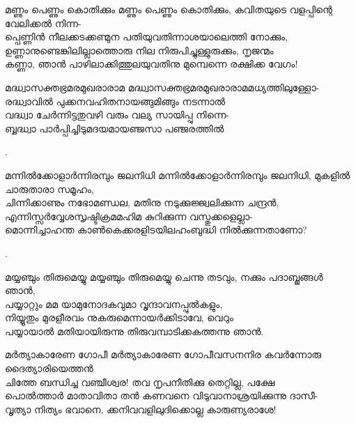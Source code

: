 \begin{enumerate}

\begin{slokam}{\VSr}{\VKG}{മണ്ണും പെണ്ണും കൊതിക്കും}
 മണ്ണും പെണ്ണും കൊതിക്കും, കവിതയുടെ വളപ്പിന്റെ വേലിക്കൽ നിന്ന-\\
പ്പെണ്ണിൻ നീലക്കടക്കണ്മുന പതിയുവതിന്നാശയാലെത്തി നോക്കും,\\
ഉണ്ണാനുണ്ടെങ്കിലില്ലാത്തൊരു നില നിരുപിച്ചുള്ളുരുക്കും, നൃജന്മം\\
കണ്ണാ, ഞാൻ പാഴിലാക്കിത്തുലയുവതിനു മുമ്പെന്നെ രക്ഷിക്ക വേഗം!
\end{slokam}




\begin{slokam}{\VMk}{\KV}{മദ്ധ്വാസക്തഭ്രമരമുഖരാരാമ}
മദ്ധ്വാസക്തഭ്രമരമുഖരാരാമമധ്യത്തിലുള്ളോ-\\
രദ്ധ്വാവിൽ പുക്കനവഹിതനായങ്ങുമിങ്ങും നടന്നാൽ\\
വദ്ധ്വാ ചേർന്നിട്ടതുവഴി വരും വല്യ സായിപ്പു നിന്നെ-\\
ബ്ബദ്ധ്വാ പാർപ്പിച്ചിടുമദയമായഞ്ജസാ പഞ്ജരത്തിൽ
\end{slokam}


.


\begin{slokam}{\VSr}{\VCBP}{മന്നിൽക്കോളാർന്നിരമ്പും ജലനിധി}
മന്നിൽക്കോളാർന്നിരമ്പും ജലനിധി, മുകളിൽ ചാരുതാരാ സമൂഹം,\\
ചിന്നിക്കാണും നഭോമണ്ഡല, മതിനു നടുക്കുജ്ജ്വലിക്കുന്ന ചന്ദ്രൻ,\\
എന്നിസ്സർവ്വേശസൃഷ്ടിക്രമമഹിമ കുറിക്കുന്ന വസ്തുക്കളെല്ലാ-\\
മൊന്നിച്ചാഹന്ത കാൺകെക്കരളിടയിലഹംബുദ്ധി നിൽക്കുന്നതാണോ?
\end{slokam}


.



\begin{slokam}{\VSv}{\VKG}{മയ്യഞ്ചും തിരുമെയ്യു}
മയ്യഞ്ചും തിരുമെയ്യു ചെന്നു തടവും, നക്കും പദാബ്ജങ്ങള്‍ ഞാൻ,\\
പയ്യാറ്റും മമ യാമുനോദകവുമാ വൃന്ദാവനപ്പുൽകളും,\\
നിയ്യൂതും മുരളീരവം നുകരുമെന്നായർക്കിടാവേ, വെറും\\
പയ്യായാൽ മതിയായിരുന്നു തിരുവമ്പാടിക്കകത്തന്നു ഞാൻ.
\end{slokam}


\begin{slokam}{\VSr}{\ONN}{മർത്യാകാരേണ ഗോപീ}
മർത്യാകാരേണ ഗോപീവസനനിര കവർന്നോരു ദൈത്യാരിയെത്തൻ\\
ചിത്തേ ബന്ധിച്ച വഞ്ചീശ്വര! തവ നൃപനീതിക്കു തെറ്റില്ല, പക്ഷേ\\
പൊൽത്താർ മാതാവിതാ തൻ കണവനെ വിടുവാനാശ്രയിക്കുന്നു ദാസീ-\\
വൃത്യാ നിത്യം ഭവാനെ, ക്കനിവവളിലുദിക്കൊല്ല കാരുണ്യരാശേ!
\end{slokam}


\end{enumerate}
